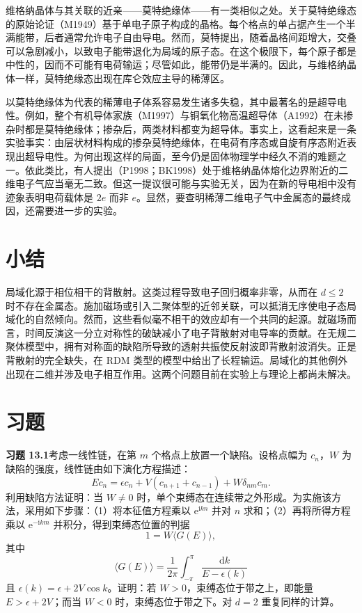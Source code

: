维格纳晶体与其关联的近亲——莫特绝缘体——有一类相似之处。关于莫特绝缘态的原始论证（M1949）基于单电子原子构成的晶格。每个格点的单占据产生一个半满能带，后者通常允许电子自由导电。然而，莫特提出，随着晶格间距增大，交叠可以急剧减小，以致电子能带退化为局域的原子态。在这个极限下，每个原子都是中性的，因而不可能有电荷输运；尽管如此，能带仍是半满的。因此，与维格纳晶体一样，莫特绝缘态出现在库仑效应主导的稀薄区。

以莫特绝缘体为代表的稀薄电子体系容易发生诸多失稳，其中最著名的是超导电性。例如，整个有机导体家族（M1997）与铜氧化物高温超导体（A1992）在未掺杂时都是莫特绝缘体；掺杂后，两类材料都变为超导体。事实上，这看起来是一条实验事实：由层状材料构成的掺杂莫特绝缘体，在电荷有序态或自旋有序态附近表现出超导电性。为何出现这样的局面，至今仍是固体物理学中经久不消的难题之一。依此类比，有人提出（P1998；BK1998）处于维格纳晶体熔化边界附近的二维电子气应当毫无二致。但这一提议很可能与实验无关，因为在新的导电相中没有迹象表明电荷载体是 $2e$ 而非 $e$。显然，要查明稀薄二维电子气中金属态的最终成因，还需要进一步的实验。

\section*{小结}

局域化源于相位相干的背散射。这类过程导致电子回归概率非零，从而在 $d\le 2$ 时不存在金属态。施加磁场或引入二聚体型的近邻关联，可以抵消无序使电子态局域化的自然倾向。然而，这些看似毫不相干的效应却有一个共同的起源。就磁场而言，时间反演这一分立对称性的破缺减小了电子背散射对电导率的贡献。在无规二聚体模型中，拥有对称面的缺陷所导致的透射共振使反射波即背散射波消失。正是背散射的完全缺失，在 RDM 类型的模型中给出了长程输运。局域化的其他例外出现在二维并涉及电子相互作用。这两个问题目前在实验上与理论上都尚未解决。

\section*{习题}

\textbf{习题 13.1}\quad 考虑一线性链，在第 $m$ 个格点上放置一个缺陷。设格点幅为 $c_{n}$，$W$ 为缺陷的强度，线性链由如下演化方程描述：
\begin{equation*}
E c_{n}=\epsilon c_{n}+V(c_{n+1}+c_{n-1})+W\delta_{nm}c_{m}.\tag{13.45}
\end{equation*}
利用缺陷方法证明：当 $W\neq 0$ 时，单个束缚态在连续带之外形成。为实施该方法，采用如下步骤：（1）将本征值方程乘以 $\mathrm{e}^{\mathrm{i}kn}$ 并对 $n$ 求和；（2）再将所得方程乘以 $\mathrm{e}^{-\mathrm{i}km}$ 并积分，得到束缚态位置的判据
\begin{equation*}
1=W\langle G(E)\rangle,\tag{13.46}
\end{equation*}
其中
\begin{equation*}
\langle G(E)\rangle=\frac{1}{2\pi}\int_{-\pi}^{\pi}\frac{\mathrm{d}k}{E-\epsilon(k)}\tag{13.47}
\end{equation*}
且 $\epsilon(k)=\epsilon+2V\cos k$。证明：若 $W>0$，束缚态位于带之上，即能量 $E>\epsilon+2V$；而当 $W<0$ 时，束缚态位于带之下。对 $d=2$ 重复同样的计算。


